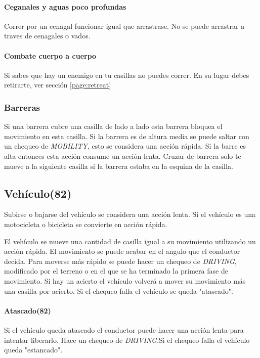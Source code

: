         \paragraph{Ceganales y aguas poco profundas}
        Correr por un cenagal funcionar igual que arrastrase. No se puede arrastrar a traves de cenagales o vados.

        \paragraph{Combate cuerpo a cuerpo}
        Si sabes que hay un enemigo en tu casillas no puedes correr. En su lugar debes retirarte, ver sección \ref{page:retreat}

        \subsubsection{Barreras}
        Si una barrera cubre una casilla de lado a lado esta barrera bloquea el movimiento en esta casilla.
        Si la barrera es de altura media se puede saltar con un chequeo de \emph{MOBILITY}, esto se considera una acción rápida. Si la barre es alta entonces esta acción consume un acción lenta. Cruzar de barrera solo te mueve a la siguiente casilla si la barrera estaba en la esquina de la casilla.

    \subsection{Vehículo(82)}

    Subirse o bajarse del vehículo se considera una acción lenta. Si el vehículo es una motocicleta o bicicleta se convierte en acción rápida.

    El vehículo se mueve una cantidad de casilla igual a su movimiento utilizando un acción rápida. El movimiento se puede acabar en el angulo que el conductor decida. Para moverse más rápido se puede hacer un chequeo de \emph{DRIVING}, modificado por el terreno o en el que se ha terminado la primera fase de movimiento. Si hay un acierto el vehículo volverá a mover su movimiento más una casilla por acierto. Si el chequeo falla el vehículo se queda "atascado".

        \paragraph{Atascado(82)}
        Si el vehículo queda atascado el conductor puede hacer una acción lenta para intentar liberarlo. Hace un chequeo de \emph{DRIVING}.Si el chequeo falla el vehículo queda "estancado".

